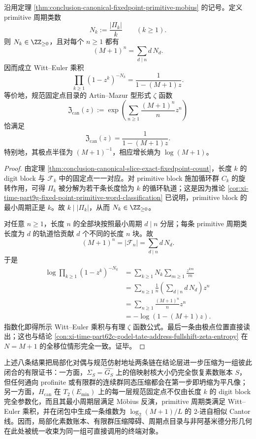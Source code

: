\begin{corollary}\label{cor:conclusion-canonical-fixedpoint-witt-euler-rational-zeta}
沿用定理 \ref{thm:conclusion-canonical-fixedpoint-primitive-mobius} 的记号。定义 primitive 周期类数
\[
N_k:=\frac{|\Pi_k|}{k}
\qquad(k\ge 1).
\]
则 \(N_k\in\ZZ_{\ge 0}\)，且对每个 \(n\ge 1\) 都有
\[
(M+1)^n=\sum_{d\mid n}d\,N_d.
\]
因而成立 Witt--Euler 乘积
\[
\prod_{k\ge 1}(1-z^k)^{-N_k}=\frac{1}{1-(M+1)z}.
\]
等价地，规范固定点目录的 Artin--Mazur 型形式 \(\zeta\) 函数
\[
\mathfrak Z_{\mathrm{can}}(z)
:=
\exp\!\left(\sum_{n\ge 1}\frac{(M+1)^n}{n}z^n\right)
\]
恰满足
\[
\mathfrak Z_{\mathrm{can}}(z)=\frac{1}{1-(M+1)z}.
\]
特别地，其极点半径为 \((M+1)^{-1}\)，相应增长熵为 \(\log(M+1)\)。
\end{corollary}
\begin{proof}
由定理 \ref{thm:conclusion-canonical-slice-exact-fixedpoint-count}，长度 \(k\) 的 digit block 与 \(\mathcal F_k\) 中的固定点一一对应。对 primitive block 施加循环群 \(C_k\) 的旋转作用，可得 \(\Pi_k\) 被分解为若干条长度恰为 \(k\) 的循环轨道；这是因为推论 \ref{cor:xi-time-part9g-fixed-point-primitive-word-classification} 已说明，primitive block 的最小周期正是 \(k\)。故 \(k\mid |\Pi_k|\)，从而 \(N_k\in\ZZ_{\ge 0}\)。

对任意 \(n\ge 1\)，长度 \(n\) 的全部块按照最小周期 \(d\mid n\) 分层；每条 primitive 周期类长度为 \(d\) 的轨道恰贡献 \(d\) 个不同的长度 \(n\) 块。故
\[
(M+1)^n=|\mathcal F_n|=\sum_{d\mid n}d\,N_d.
\]
于是
\[
\begin{aligned}
\log\prod_{k\ge 1}(1-z^k)^{-N_k}
&=
\sum_{k\ge 1}N_k\sum_{m\ge 1}\frac{z^{km}}{m}\\
&=
\sum_{n\ge 1}\frac{1}{n}\left(\sum_{d\mid n}d\,N_d\right)z^n\\
&=
\sum_{n\ge 1}\frac{(M+1)^n}{n}z^n\\
&=
-\log(1-(M+1)z).
\end{aligned}
\]
指数化即得所示 Witt--Euler 乘积与有理 \(\zeta\) 函数公式。最后一条由极点位置直接读出；这也与结论 \ref{con:xi-time-part62c-godel-tate-address-fullshift-zeta-entropy} 在 \(N=M+1\) 的全移位情形完全一致。证毕。
\end{proof}

上述八条结果把局部化对偶与规范仿射地址两条链在结论层进一步压缩为一组彼此闭合的有限证书：一方面，\(\Sigma_S=\widehat{G_S}\) 上的倍映射核大小仍完全恢复素数账本 \(S\)，但任何通向 profinite 或有限群的连续群同态压缩都会在第一步即坍缩为平凡像；另一方面，\(H_{\mathrm{can}}\) 在 \(T_2(E_{\min})\) 上的每一层规范固定点不仅由长度 \(k\) 的 digit block 完全参数化，而且其最小周期层满足 Möbius 反演，primitive 周期类满足 Witt--Euler 乘积，并在闭包中生成一条维数为 \(\log_2(M+1)/L\) 的 \(2\)-进自相似 Cantor 线。因而，局部化素数账本、有限群压缩障碍、周期点目录与非阿基米德分形几何在此处被统一收束为同一组可直接调用的终端对象。

\endinput
